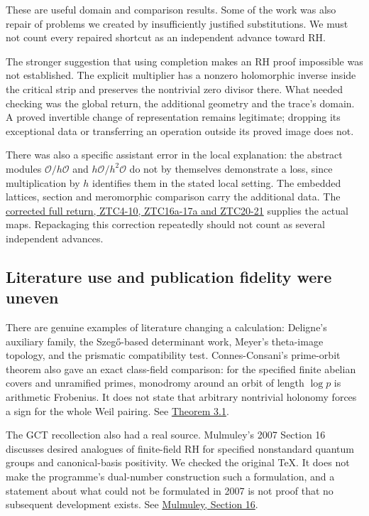 \documentclass[
  british,
  11pt,
  a4paper,
]{article}
\begin{document}
These are useful domain and comparison results. Some of the work was
also repair of problems we created by insufficiently justified
substitutions. We must not count every repaired shortcut as an
independent advance toward RH.

The stronger suggestion that using completion makes an RH proof
impossible was not established. The explicit multiplier has a nonzero
holomorphic inverse inside the critical strip and preserves the
nontrivial zero divisor there. What needed checking was the global
return, the additional geometry and the trace's domain. A proved
invertible change of representation remains legitimate; dropping its
exceptional data or transferring an operation outside its proved image
does not.

There was also a specific assistant error in the local explanation: the
abstract modules \(\mathcal O/h\mathcal O\) and
\(h\mathcal O/h^2\mathcal O\) do not by themselves demonstrate a loss,
since multiplication by \(h\) identifies them in the stated local
setting. The embedded lattices, section and meromorphic comparison carry
the additional data. The
\href{https://github.com/KokunoYumeto/zeta-function-research-reader/blob/acd7016b8232a56f31ae3e69fb800571e8789080/workbenches/splitzero-tandem/continuations/20260923-retained-source-readers/original-zeta-full-boundary/CC_WEIL_BOUNDARY_READER.tex}{corrected
full return, ZTC4-10, ZTC16a-17a and ZTC20-21} supplies the actual maps.
Repackaging this correction repeatedly should not count as several
independent advances.

\subsection{Literature use and publication fidelity were
uneven}\label{literature-use-and-publication-fidelity-were-uneven}

There are genuine examples of literature changing a calculation:
Deligne's auxiliary family, the Szegő-based determinant work, Meyer's
theta-image topology, and the prismatic compatibility test.
Connes-Consani's prime-orbit theorem also gave an exact class-field
comparison: for the specified finite abelian covers and unramified
primes, monodromy around an orbit of length \(\log p\) is arithmetic
Frobenius. It does not state that arbitrary nontrivial holonomy forces a
sign for the whole Weil pairing. See
\href{https://arxiv.org/abs/2501.06560v1}{Theorem 3.1}.

The GCT recollection also had a real source. Mulmuley's 2007 Section 16
discusses desired analogues of finite-field RH for specified nonstandard
quantum groups and canonical-basis positivity. We checked the original
TeX. It does not make the programme's dual-number construction such a
formulation, and a statement about what could not be formulated in 2007
is not proof that no subsequent development exists. See
\href{https://arxiv.org/abs/0709.0748v1}{Mulmuley, Section 16}.
\end{document}
